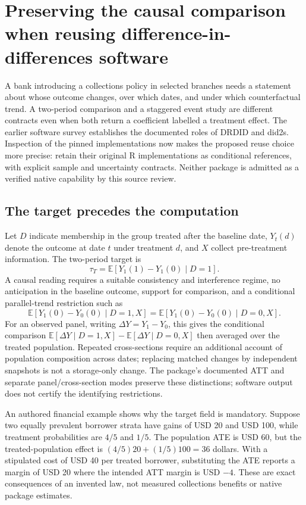 \section{Preserving the causal comparison when reusing difference-in-differences software}
\label{sec:exec24-panel-reuse}
A bank introducing a collections policy in selected branches needs a statement
about whose outcome changes, over which dates, and under which counterfactual
trend. A two-period comparison and a staggered event study are different
contracts even when both return a coefficient labelled a treatment effect.
The earlier software survey establishes the documented roles of DRDID and
did2s. Inspection of the pinned implementations now makes the proposed reuse
choice more precise: retain their original R implementations as conditional
references, with explicit sample and uncertainty contracts. Neither package is
admitted as a verified native capability by this source review.
\citep{v12_sw_drdid,v12_sw_did2s,exec24_drdid_reuse_source,exec24_did2s_reuse_source}

\subsection{The target precedes the computation}
Let $D$ indicate membership in the group treated after the baseline date,
$Y_t(d)$ denote the outcome at date $t$ under treatment $d$, and $X$ collect
pre-treatment information. The two-period target is
\[
 \tau_T=\mathbb E[Y_1(1)-Y_1(0)\mid D=1].
\]
A causal reading requires a suitable consistency and interference regime,
no anticipation in the baseline outcome, support for comparison, and a
conditional parallel-trend restriction such as
\[
 \mathbb E[Y_1(0)-Y_0(0)\mid D=1,X]
 =\mathbb E[Y_1(0)-Y_0(0)\mid D=0,X].
\]
For an observed panel, writing $\Delta Y=Y_1-Y_0$, this gives the conditional
comparison $\mathbb E[\Delta Y\mid D=1,X]-\mathbb E[\Delta Y\mid D=0,X]$
then averaged over the treated population. Repeated cross-sections require
an additional account of population composition across dates; replacing
matched changes by independent snapshots is not a storage-only change.
The package's documented ATT and separate panel/cross-section modes preserve
these distinctions; software output does not certify the identifying
restrictions.\citep{v12_sw_drdid,exec24_drdid_reuse_source}

An authored financial example shows why the target field is mandatory.
Suppose two equally prevalent borrower strata have gains of USD 20 and USD 100,
while treatment probabilities are $4/5$ and $1/5$. The population ATE is
USD 60, but the treated-population effect is
$(4/5)20+(1/5)100=36$ dollars. With a stipulated cost of USD 40 per treated
borrower, substituting the ATE reports a margin of USD 20 where the intended
ATT margin is USD $-4$. These are exact consequences of an invented law,
not measured collections benefits or native package estimates.
\citep{exec24_panel_reuse_reference}

